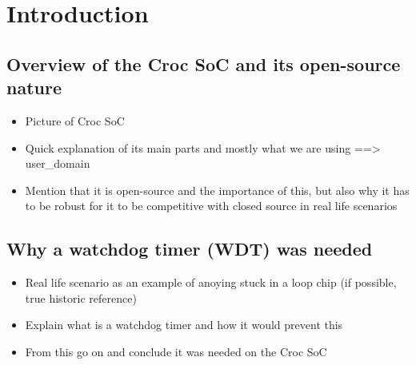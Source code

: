 
\chapter{Introduction}
\label{chap:introduction}

\section{Overview of the Croc SoC and its open-source nature}
\begin{itemize}
  \item{Picture of Croc SoC}
  \item{Quick explanation of its main parts and mostly what we are using ==> user_domain}
  \item{Mention that it is open-source and the importance of this, but also why it has to be robust for it to be competitive with closed source in real life scenarios}
\end{itemize}
\section{Why a watchdog timer (WDT) was needed}
\begin{itemize}
  \item Real life scenario as an example of anoying stuck in a loop chip (if possible, true historic reference)
  \item Explain what is a watchdog timer and how it would prevent this
  \item From this go on and conclude it was needed on the Croc SoC
\end{itemize}

